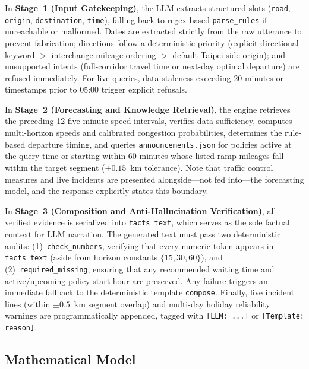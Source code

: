 \documentclass[conference]{IEEEtran}
\begin{document}
In \textbf{Stage~1 (Input Gatekeeping)}, the LLM extracts structured slots (\texttt{road}, \texttt{origin}, \texttt{destination}, \texttt{time}), falling back to regex-based \texttt{parse\_rules} if unreachable or malformed. Dates are extracted strictly from the raw utterance to prevent fabrication; directions follow a deterministic priority (explicit directional keyword $>$ interchange mileage ordering $>$ default Taipei-side origin); and unsupported intents (full-corridor travel time or next-day optimal departure) are refused immediately. For live queries, data staleness exceeding 20 minutes or timestamps prior to 05:00 trigger explicit refusals.

In \textbf{Stage~2 (Forecasting and Knowledge Retrieval)}, the engine retrieves the preceding 12 five-minute speed intervals, verifies data sufficiency, computes multi-horizon speeds and calibrated congestion probabilities, determines the rule-based departure timing, and queries \texttt{announcements.json} for policies active at the query time or starting within 60 minutes whose listed ramp mileages fall within the target segment ($\pm 0.15$~km tolerance). Note that traffic control measures and live incidents are presented alongside---not fed into---the forecasting model, and the response explicitly states this boundary.

In \textbf{Stage~3 (Composition and Anti-Hallucination Verification)}, all verified evidence is serialized into \texttt{facts\_text}, which serves as the sole factual context for LLM narration. The generated text must pass two deterministic audits: (1)~\texttt{check\_numbers}, verifying that every numeric token appears in \texttt{facts\_text} (aside from horizon constants $\{15, 30, 60\}$), and (2)~\texttt{required\_missing}, ensuring that any recommended waiting time and active/upcoming policy start hour are preserved. Any failure triggers an immediate fallback to the deterministic template \texttt{compose}. Finally, live incident lines (within $\pm 0.5$~km segment overlap) and multi-day holiday reliability warnings are programmatically appended, tagged with \texttt{[LLM: ...]} or \texttt{[Template: reason]}.

\subsection{Mathematical Model}
\end{document}
